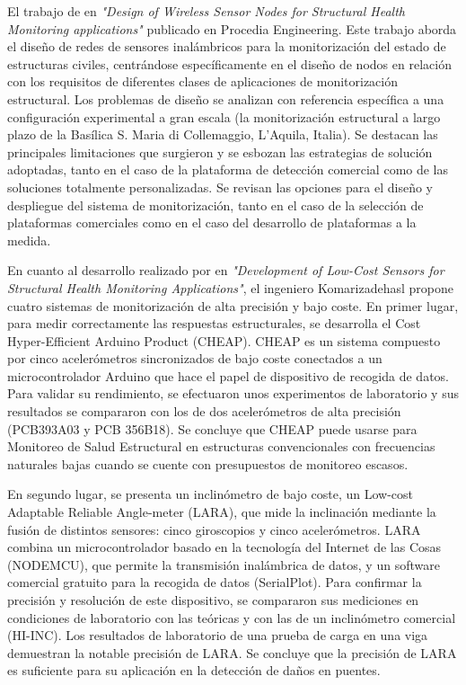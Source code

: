 \documentclass[12pt,letterpaper]{article}
\begin{document}
El trabajo de \cite{federici2014design} en \textit{"Design of Wireless Sensor Nodes for Structural Health Monitoring applications"} publicado en Procedia Engineering. Este trabajo aborda el diseño de redes de sensores inalámbricos para la monitorización del estado de estructuras civiles, centrándose específicamente en el diseño de nodos en relación con los requisitos de diferentes clases de aplicaciones de monitorización estructural.
Los problemas de diseño se analizan con referencia específica a una configuración experimental a gran escala (la monitorización estructural a largo plazo de la Basílica S. Maria di Collemaggio, L'Aquila, Italia). Se destacan las principales limitaciones que surgieron y se esbozan las estrategias de solución adoptadas, tanto en el caso de la plataforma de detección comercial como de las soluciones totalmente personalizadas. Se revisan las opciones para el diseño y despliegue del sistema de monitorización, tanto en el caso de la selección de plataformas comerciales como en el caso del desarrollo de plataformas a la medida.

En cuanto al desarrollo realizado por \cite{komarizadehasl2022development} en \textit{"Development of Low-Cost Sensors for Structural Health Monitoring Applications"}, el ingeniero Komarizadehasl propone cuatro sistemas de monitorización de alta precisión y bajo coste.
En primer lugar, para medir correctamente las respuestas estructurales, se desarrolla el Cost Hyper-Efficient Arduino Product (CHEAP). CHEAP es un sistema compuesto por cinco acelerómetros sincronizados de bajo coste conectados a un microcontrolador Arduino que hace el papel de dispositivo de recogida de datos. Para validar su rendimiento, se efectuaron unos experimentos de laboratorio y sus resultados se compararon con los de dos acelerómetros de alta precisión (PCB393A03 y PCB 356B18). Se concluye que CHEAP puede usarse para Monitoreo de Salud Estructural en estructuras convencionales con frecuencias naturales bajas cuando se cuente con presupuestos de monitoreo escasos. 

En segundo lugar, se presenta un inclinómetro de bajo coste, un Low-cost Adaptable Reliable Angle-meter (LARA), que mide la inclinación mediante la fusión de distintos sensores: cinco giroscopios y cinco acelerómetros. LARA combina un microcontrolador basado en la tecnología del Internet de las Cosas (NODEMCU), que permite la transmisión inalámbrica de datos, y un software comercial gratuito para la recogida de datos (SerialPlot). Para confirmar la precisión y resolución de este dispositivo, se compararon sus mediciones en condiciones de laboratorio con las teóricas y con las de un inclinómetro comercial (HI-INC). Los resultados de laboratorio de una prueba de carga en una viga demuestran la notable precisión de LARA. Se concluye que la precisión de LARA es suficiente para su aplicación en la detección de daños en puentes.
\end{document}

